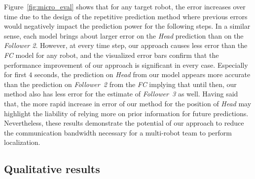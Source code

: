 \documentclass[letterpaper, 10 pt, conference]{ieeeconf}  %
\begin{document}
    Figure~\ref{fig:micro_eval} shows that for any target robot, the
    error increases over time due to the design of the repetitive
    prediction method where previous errors would negatively impact the
    prediction power for the following steps. In a similar sense, each
    model brings about larger error on the \emph{Head} prediction than
    on the \emph{Follower 2}. However, at every time step, our approach
    causes less error than the \emph{FC} model for any robot, and the
    visualized error bars confirm that the performance improvement of
    our approach is significant in every case. Especially for first $4$
    seconds, the prediction on \emph{Head} from our model appears more
    accurate than the prediction on \emph{Follower~2} from the \emph{FC}
    implying that until then, our method also has less error for the
    estimate of \emph{Follower~3} as well. Having said that, the more
    rapid increase in error of our method for the position of
    \emph{Head} may highlight the liability of relying more on prior
    information for future predictions. Nevertheless, these results
    demonstrate the potential of our approach to reduce the
    communication bandwidth necessary for a multi-robot team to perform
    localization.

	\subsection{Qualitative results}
	\label{sec:qualitative_results}
\end{document}
